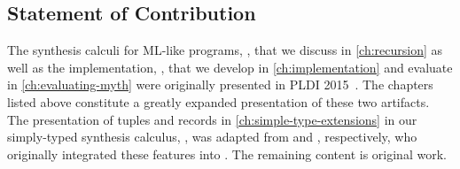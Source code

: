 \subsection{Statement of Contribution}

The synthesis calculi for ML-like programs, \mlsyn{}, that we discuss in \autoref{ch:recursion} as well as the implementation, \myth{}, that we develop in \autoref{ch:implementation} and evaluate in \autoref{ch:evaluating-myth} were originally presented in {PLDI} 2015~\citep{osera-pldi-2015}.
The chapters listed above constitute a greatly expanded presentation of these two artifacts.
The presentation of tuples and records in \autoref{ch:simple-type-extensions} in our simply-typed synthesis calculus, \lsyn{}, was adapted from \citet{frankle-mastersthesis-2015} and \citet{shah-mastersthesis-2015}, respectively, who originally integrated these features into \mlsyn{}.
The remaining content is original work.
